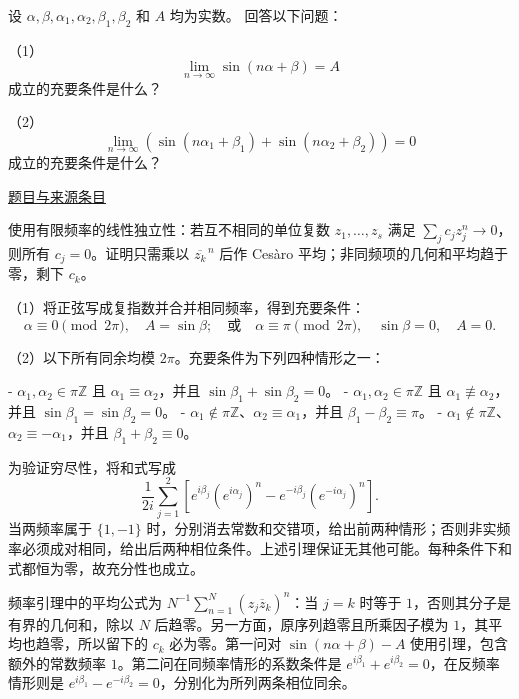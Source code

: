 \documentclass[UTF8,12pt,a4paper,fontset=fandol]{ctexart}
\begin{document}
\begin{example}\label{ex:fin12-low:8}\label{pr:fin12-low:8}

设 $\alpha, \beta, \alpha_{1}, \alpha_{2}, \beta_{1}, \beta_{2}$ 和 $A$ 均为实数。 回答以下问题：

（1）\[
\lim_{n \to \infty} \sin(n\alpha + \beta) = A
\]
成立的充要条件是什么？

（2）\[
\lim_{n \to \infty} \left(\sin(n\alpha_1 + \beta_1) + \sin(n\alpha_2 + \beta_2)\right) = 0
\]
成立的充要条件是什么？

\par\href{https://github.com/lzxcr/cmc-mathematics/blob/64916fa1fdbc3e444a652eca204d5669058ee321/src/problems/finals/12/08.md}{题目与来源条目}

\end{example}

\begin{solve}\label{ans:fin12-low:8}

使用有限频率的线性独立性：若互不相同的单位复数 $z_1,\ldots,z_s$ 满足 $\sum_jc_jz_j^n\to0$，则所有 $c_j=0$。证明只需乘以 $\overline{z_k}^{\,n}$ 后作 Cesàro 平均；非同频项的几何和平均趋于零，剩下 $c_k$。

（1）将正弦写成复指数并合并相同频率，得到充要条件：
\[
\alpha\equiv0\pmod{2\pi},\quad A=\sin\beta;
\quad\text{或}\quad
\alpha\equiv\pi\pmod{2\pi},\quad\sin\beta=0,\quad A=0.
\]

（2）以下所有同余均模 $2\pi$。充要条件为下列四种情形之一：

- $\alpha_1,\alpha_2\in\pi\mathbb Z$ 且 $\alpha_1\equiv\alpha_2$，并且 $\sin\beta_1+\sin\beta_2=0$。
- $\alpha_1,\alpha_2\in\pi\mathbb Z$ 且 $\alpha_1\not\equiv\alpha_2$，并且 $\sin\beta_1=\sin\beta_2=0$。
- $\alpha_1\notin\pi\mathbb Z$、$\alpha_2\equiv\alpha_1$，并且 $\beta_1-\beta_2\equiv\pi$。
- $\alpha_1\notin\pi\mathbb Z$、$\alpha_2\equiv-\alpha_1$，并且 $\beta_1+\beta_2\equiv0$。

为验证穷尽性，将和式写成
\[
\frac1{2i}\sum_{j=1}^2\left[e^{i\beta_j}(e^{i\alpha_j})^n-e^{-i\beta_j}(e^{-i\alpha_j})^n\right].
\]
当两频率属于 $\{1,-1\}$ 时，分别消去常数和交错项，给出前两种情形；否则非实频率必须成对相同，给出后两种相位条件。上述引理保证无其他可能。每种条件下和式都恒为零，故充分性也成立。

频率引理中的平均公式为 $N^{-1}\sum_{n=1}^N(z_j\overline z_k)^n$：当 $j=k$ 时等于 $1$，否则其分子是有界的几何和，除以 $N$ 后趋零。另一方面，原序列趋零且所乘因子模为 $1$，其平均也趋零，所以留下的 $c_k$ 必为零。第一问对 $\sin(n\alpha+\beta)-A$ 使用引理，包含额外的常数频率 $1$。第二问在同频率情形的系数条件是 $e^{i\beta_1}+e^{i\beta_2}=0$，在反频率情形则是 $e^{i\beta_1}-e^{-i\beta_2}=0$，分别化为所列两条相位同余。

\end{solve}
\end{document}
